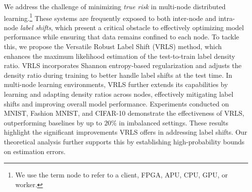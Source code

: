 We address the challenge of minimizing {\it true risk} in multi-node distributed learning.\footnote{We use the term node to refer to a client, FPGA, APU, CPU, GPU, or worker.} These systems are frequently exposed to both inter-node and intra-node {\it label shifts}, which present a critical obstacle to effectively optimizing model performance while ensuring that data remains confined to each node.
To tackle this, we propose the Versatile Robust Label Shift (VRLS) method, which enhances the maximum likelihood estimation of the test-to-train label density ratio. VRLS incorporates Shannon entropy-based regularization and adjusts the density ratio during training  to better handle label shifts at the test time.
In multi-node learning environments, VRLS further extends its capabilities by learning and adapting density ratios across nodes, effectively mitigating label shifts and improving overall model performance. Experiments conducted on MNIST, Fashion MNIST, and CIFAR-10 demonstrate the effectiveness of VRLS, outperforming baselines by up to $20\%$ in imbalanced settings. These results highlight the significant improvements VRLS offers in addressing label shifts. Our theoretical analysis further supports this by establishing high-probability bounds on estimation errors.

